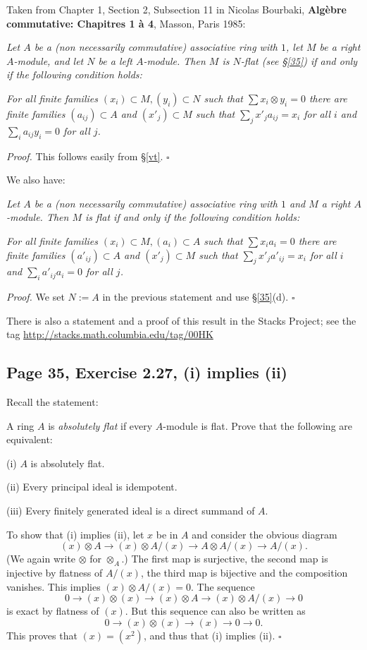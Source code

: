 \documentclass[parskip=half,fontsize=12pt]{scrartcl}%
\begin{document}
Taken from Chapter 1, Section 2, Subsection 11 in Nicolas Bourbaki, \textbf{Algèbre commutative: Chapitres 1 à 4}, Masson, Paris 1985:

\emph{Let $A$ be a (non necessarily commutative) associative ring with $1$, let $M$ be a right $A$-module, and let $N$ be a left $A$-module. Then $M$ is $N$-flat (see \S\ref{35}) if and only if the following condition holds:}

\emph{For all finite families $(x_i)\subset M,(y_i)\subset N$ such that $\sum x_i\otimes y_i=0$ there are finite families $(a_{ij})\subset A$ and $(x'_j)\subset M$ such that $\sum_jx'_ja_{ij}=x_i$ for all $i$ and $\sum_ia_{ij}y_i=0$ for all $j$.}

\emph{Proof.} This follows easily from \S\ref{vt}. $\square$

We also have:

\emph{Let $A$ be a (non necessarily commutative) associative ring with $1$ and $M$ a right $A$-module. Then $M$ is flat if and only if the following condition holds:}

\emph{For all finite families $(x_i)\subset M,(a_i)\subset A$ such that $\sum x_ia_i=0$ there are finite families $(a'_{ij})\subset A$ and $(x'_j)\subset M$ such that $\sum_jx'_ja'_{ij}=x_i$ for all $i$ and $\sum_ia'_{ij}a_i=0$ for all $j$.}

\emph{Proof.} We set $N:=A$ in the previous statement and use \S\ref{35}(d). $\square$

There is also a statement and a proof of this result in the Stacks Project; see the tag \href{http://stacks.math.columbia.edu/tag/00HK}{http://stacks.math.columbia.edu/tag/00HK}

\subsection{Page 35, Exercise 2.27, (i) implies (ii)}\label{227}%

Recall the statement: 

A ring $A$ is \emph{absolutely flat} if every $A$-module is flat. Prove that the following are equivalent:

(i) $A$ is absolutely flat.

(ii) Every principal ideal is idempotent.

(iii) Every finitely generated ideal is a direct summand of $A$.

To show that (i) implies (ii), let $x$ be in $A$ and consider the obvious diagram
$$
(x)\otimes A\to(x)\otimes A/(x)\to A\otimes A/(x)\to A/(x). 
$$ 
(We again write $\otimes$ for $\otimes_A$.) The first map is surjective, the second map is injective by flatness of $A/(x)$, the third map is bijective and the composition vanishes. This implies $(x)\otimes A/(x)=0$. The sequence 
$$
0\to(x)\otimes(x)\to(x)\otimes A\to(x)\otimes A/(x)\to0
$$ 
is exact by flatness of $(x)$. But this sequence can also be written as 
$$
0\to(x)\otimes(x)\to(x)\to0\to0.
$$ 
This proves that $(x)=(x^2)$, and thus that (i) implies (ii). $\square$
\end{document}
